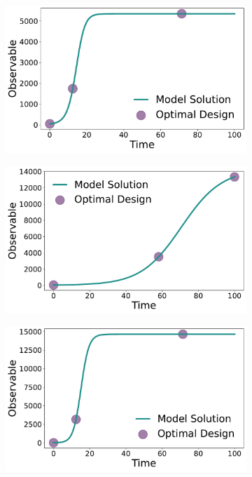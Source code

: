 \documentclass[graybox]{svmult}
\begin{document}
%
%
\begin{figure}[H]
    \begin{subfigure}{.5\textwidth}
        \centering
        \includegraphics[scale=0.25]{Figures/Fig9a.pdf}
      \end{subfigure} 
    \begin{subfigure}{.5\textwidth}
        \centering
        \includegraphics[scale=0.25]{Figures/Fig9b.pdf}
    \end{subfigure}
      \begin{subfigure}{.5\textwidth}
        \centering
        \includegraphics[scale=0.25]{Figures/Fig9c.pdf}

\end{subfigure}
\end{figure}
\end{document}

